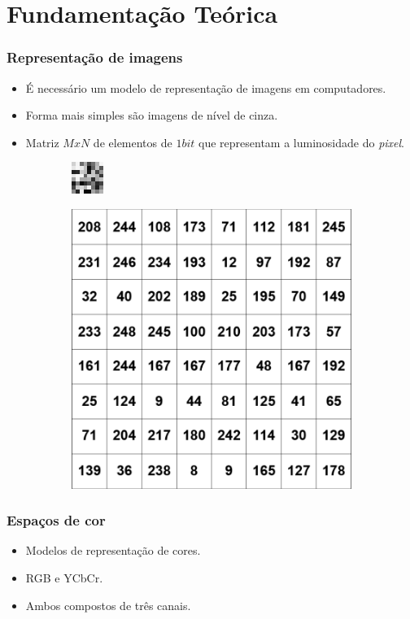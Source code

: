 \documentclass{beamer}
\begin{document}
\section{Fundamentação Teórica}
\begin{frame}
\frametitle{Representação de imagens}
\begin{itemize}
  \item É necessário um modelo de representação de imagens em computadores.
  \item Forma mais simples são imagens de nível de cinza.
  \item Matriz $MxN$ de elementos de $1 bit$ que representam a luminosidade do \textit{pixel}.
\end{itemize}

\begin{figure}
 \centering
 \begin{subfigure}{.5\textwidth}
  \centering
  \includegraphics[width=.5\linewidth]{ExemploNivelCinza}
  \caption{}
  \label{exemplo:sfig2}
\end{subfigure}%
\begin{subfigure}{.5\textwidth}
  \centering
  \includegraphics[width=.5\linewidth]{MatrizNivelCinza}
  \caption{}
  \label{exemplo:sfig1}
\end{subfigure}%
\end{figure}


\end{frame}
\begin{frame}
\frametitle{Espaços de cor}
\begin{itemize}
  \item Modelos de representação de cores.
  \item RGB e YCbCr.
  \item Ambos compostos de três canais.
\end{itemize}
\end{frame}
\end{document}
